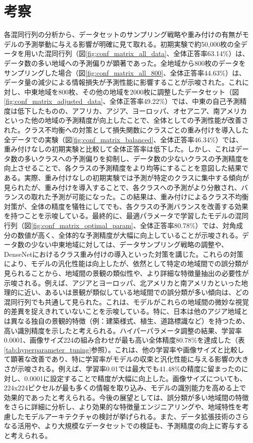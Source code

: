 \documentclass[a4paper, 11pt, titlepage]{jsarticle}
\begin{document}
\section{考察}各混同行列の分析から、データセットのサンプリング戦略や重み付けの有無がモデルの予測挙動に与える影響が明確に見て取れる。初期実験で約50,000枚の全データを用いた混同行列（図\ref{fig:conf_matrix_all_data}、全体正答率63.14\%）は、データ数の多い地域への予測偏りが顕著であった。全地域から800枚のデータをサンプリングした場合（図\ref{fig:conf_matrix_all_800}、全体正答率44.63\%）は、データ量の減少による情報損失が予測性能に影響することが示唆された。これに対し、中東地域を800枚、その他の地域を2000枚に調整したデータセット（図\ref{fig:conf_matrix_adjusted_data}、全体正答率49.22\%）では、中東の自己予測精度は低下したものの、アフリカ、アジア、ヨーロッパ、オセアニア、南アメリカといった他の地域の予測精度が向上したことで、全体としての予測性能が改善された。クラス不均衡への対策として損失関数にクラスごとの重み付けを導入した全データでの実験（図\ref{fig:conf_matrix_balanced}、全体正答率46.34\%）では、重み付けなしの初期実験と比較して全体正答率は低下した。しかし、これはデータ数の多いクラスへの予測偏りを抑制し、データ数の少ないクラスの予測精度を向上させることで、各クラスの予測精度をより均等にすることを意図した結果である。実際、重み付けなしの初期実験では予測が特定のクラスに集中する傾向が見られたが、重み付けを導入することで、各クラスへの予測がより分散され、バランスの取れた予測が可能になった。この結果は、重み付けによるクラス不均衡対策が、全体の精度を犠牲にしてでも、各クラスの予測バランスを改善する効果を持つことを示唆している。最終的に、最適パラメータで学習したモデルの混同行列（図\ref{fig:conf_matrix_optimal_param}、全体正答率80.78\%）では、対角成分の数値が高く、全体的な予測精度が大幅に向上していることが示唆される。データ数の少ない中東地域に対しては、データサンプリング戦略の調整や、DenseNetにおけるクラス重み付けの導入といった対策を講じた。これらの対策により、モデルの汎化性能は向上したが、依然として特定の地域間での誤分類が見られることから、地域間の景観の類似性や、より詳細な特徴量抽出の必要性が示唆される。例えば、アジアとヨーロッパ、北アメリカと南アメリカといった地理的に近い、あるいは景観が類似している地域間での誤分類が多い傾向は、どの混同行列でも共通して見られた。これは、モデルがこれらの地域間の微妙な視覚的差異を捉えきれていないことを示唆している。特に、日本は他のアジア地域とは異なる独自の景観的特徴（例：建築様式、植生、道路標識など）を持つため、高い識別精度を示したと考えられる。ハイパーパラメータ調整の結果、学習率0.0001、画像サイズ224の組み合わせが最も高い全体精度80.78\%を達成した（表\ref{tab:hyperparameter_tuning}参照）。これは、他の学習率や画像サイズと比較して顕著な改善であり、特に学習率がモデルの収束と汎化性能に与える影響の大きさが示唆される。例えば、学習率0.01では最大でも41.48\%の精度に留まったのに対し、0.0001に設定することで精度が大幅に向上した。画像サイズについても、224x224ピクセルが最も多くの情報を取り込み、モデルの識別能力を高める上で効果的であったと考えられる。今後の展望としては、誤分類が多い地域間の特徴をさらに詳細に分析し、より効果的な特徴量エンジニアリングや、地域特性を考慮したモデルアーキテクチャの検討が挙げられる。また、データ拡張技術のさらなる活用や、より大規模なデータセットでの検証も、予測精度の向上に寄与すると考えられる。
\end{document}
